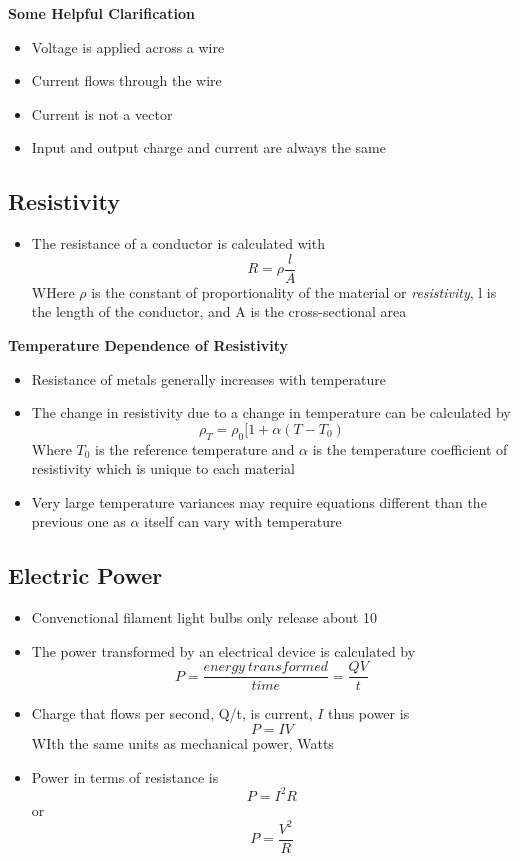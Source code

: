 \textbf{Some Helpful Clarification}
\begin{itemize}
    \item Voltage is applied across a wire
    \item Current flows through the wire
    \item Current is not a vector
    \item Input and output charge and current are always the same 
\end{itemize}

\subsection{Resistivity}
\begin{itemize}
    \item The resistance of a conductor is calculated with \[R=\rho\frac{l}{A}\] WHere \(\rho\) is the constant of proportionality of the material or \emph{resistivity}, l is the length of the conductor, and A is the cross-sectional area
\end{itemize}

\textbf{Temperature Dependence of Resistivity}
\begin{itemize}
    \item Resistance of metals generally increases with temperature
    \item The change in resistivity due to a change in temperature can be calculated by \[\rho_T=\rho_0[1+\alpha(T-T_0)\] Where \(T_0\) is the reference temperature and \(\alpha\) is the temperature coefficient of resistivity which is unique to each material
    \item Very large temperature variances may require equations different than the previous one as \(\alpha\) itself can vary with temperature
\end{itemize}

\subsection{Electric Power}
\begin{itemize}
    \item Convenctional filament light bulbs only release about 10%
    \item The power transformed by an electrical device is calculated by \[P=\frac{energy\ transformed}{time}=\frac{QV}{t}\]
    \item Charge that flows per second, Q/t, is current, \(I\) thus power is \[P=IV\] WIth the same units as mechanical power, Watts
    \item Power in terms of resistance is \[P=I^2R\] or \[P=\frac{V^2}{R}\]
\end{itemize}

